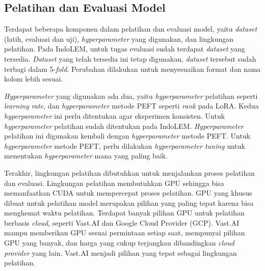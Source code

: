 \subsection{Pelatihan dan Evaluasi Model}

Terdapat beberapa komponen dalam pelatihan dan evaluasi model, yaitu \textit{dataset} (latih, evaluasi dan uji), \textit{hyperparameter} yang digunakan, dan lingkungan pelatihan. Pada IndoLEM, untuk tugas evaluasi \nlptask sudah terdapat \textit{dataset} yang tersedia. \textit{Dataset} yang telah tersedia ini tetap digunakan, \textit{dataset} tersebut sudah terbagi dalam 5-\textit{fold}. Perubahan dilakukan untuk menyesuaikan format dan nama kolom  lebih sesuai.

\textit{Hyperparameter} yang digunakan ada dua, yaitu \textit{hyperparameter} pelatihan seperti \textit{learning rate}, dan \textit{hyperparameter} metode PEFT seperti \textit{rank} pada LoRA. Kedua \textit{hyperparameter} ini perlu ditentukan agar eksperimen konsisten. Untuk \textit{hyperparameter} pelatihan sudah ditentukan pada IndoLEM. \textit{Hyperparameter} pelatihan ini digunakan kembali dengan \textit{hyperparameter} metode PEFT. Untuk \textit{hyperparameter} metode PEFT, perlu dilakukan \textit{hyperparameter tuning} untuk menentukan \textit{hyperparameter} mana yang paling baik.

Terakhir, lingkungan pelatihan dibutuhkan untuk menjalankan proses pelatihan dan evaluasi. Lingkungan pelatihan membutuhkan GPU sehingga bisa memanfaatkan CUDA untuk mempercepat proses pelatihan. GPU yang khusus dibuat untuk pelatihan model merupakan pilihan yang paling tepat karena bisa menghemat waktu pelatihan. Terdapat banyak pilihan GPU untuk pelatihan berbasis \textit{cloud}, seperti Vast.AI dan Google Cloud Provider (GCP). Vast.AI mampu memberikan GPU sesuai permintaan setiap saat, mempunyai pilihan GPU yang banyak, dan harga yang cukup terjangkau dibandingkan \textit{cloud provider} yang lain. Vast.AI menjadi pilihan yang tepat sebagai lingkungan pelatihan.

